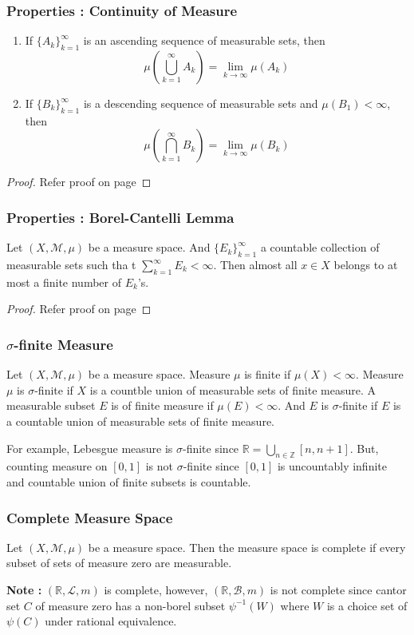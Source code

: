 \subsubsection{Properties : Continuity of Measure}
\begin{enumerate}
	\item If $\{ A_k \}_{k=1}^\infty$ is an ascending sequence of measurable sets, then
		\[ \mu\left( \bigcup_{k=1}^\infty A_k \right) = \lim_{k \to \infty} \mu(A_k) \]
	\item If $\{ B_k \}_{k=1}^\infty$ is a descending sequence of measurable sets and $\mu(B_1) < \infty$, then
		\[ \mu \left( \bigcap_{k=1}^\infty B_k \right) = \lim_{k \to \infty} \mu(B_k) \]
\end{enumerate}
\begin{proof}
	Refer proof on page \pageref{thm:continuityofmeasure}
\end{proof}
\subsubsection{Properties : Borel-Cantelli Lemma}
	Let $(X,\mathcal{M},\mu)$ be a measure space.
And $\{ E_k \}_{k=1}^\infty$ a countable collection of measurable sets such tha t $\displaystyle \sum_{k=1}^\infty E_k < \infty$.
	Then almost all $x \in X$ belongs to at most a finite number of $E_k$'s.
\begin{proof}
	Refer proof on page \pageref{lem:borelcantelli}
\end{proof}
\subsubsection{$\sigma$-finite Measure}
\begin{definition}
	Let $(X,\mathcal{M},\mu)$ be a measure space.
	Measure $\mu$ is finite if $\mu(X) < \infty$.
	Measure $\mu$ is $\sigma$-finite if $X$ is a countble union of measurable sets of finite measure.
	A measurable subset $E$ is of finite measure if $\mu(E) < \infty$.
	And $E$ is $\sigma$-finite if $E$ is a countable union of measurable sets of finite measure.
\end{definition}
For example, Lebesgue measure is $\sigma$-finite since $\mathbb{R} = \bigcup_{n \in \mathbb{Z}} [n,n+1]$. But, counting measure on $[0,1]$ is not $\sigma$-finite since $[0,1]$ is uncountably infinite and countable union of finite subsets is countable.
\subsubsection{Complete Measure Space}
\begin{definition}
	Let $(X,\mathcal{M},\mu)$ be a measure space.
	Then the measure space is complete if every subset of sets of measure zero are measurable.
\end{definition}
\textbf{Note : } $(\mathbb{R},\mathcal{L},m)$ is complete, however, $(\mathbb{R},\mathcal{B},m)$ is not complete since cantor set $C$  of measure zero has a non-borel subset $\psi^{-1}(W)$ where $W$ is a choice set of $\psi(C)$ under rational equivalence.

